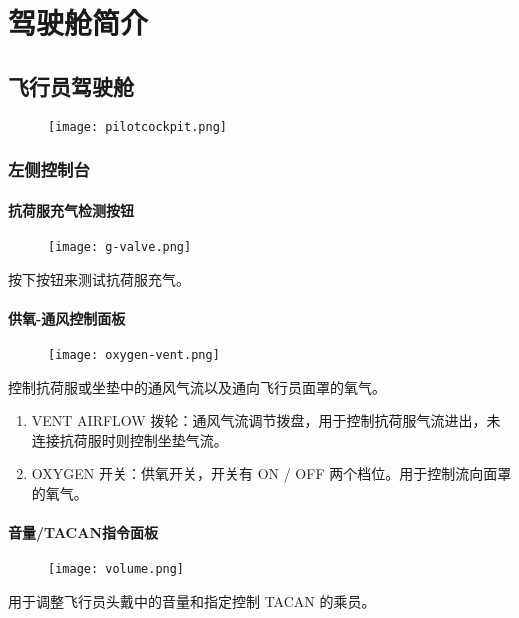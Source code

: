 
\chapter{驾驶舱简介}

\section{飞行员驾驶舱}

\begin{figure}[htb]
  \center
  \texttt{[image: pilotcockpit.png]}
\end{figure}

\subsection{左侧控制台}

\subsubsection{抗荷服充气检测按钮}
\begin{figure}[htb]
  \center
  \texttt{[image: g-valve.png]}
\end{figure}
按下按钮来测试抗荷服充气。

\subsubsection{供氧-通风控制面板}

\begin{figure}[htb]
  \center
  \texttt{[image: oxygen-vent.png]}
\end{figure}
控制抗荷服或坐垫中的通风气流以及通向飞行员面罩的氧气。

\begin{enumerate}
  \item VENT AIRFLOW 拨轮：通风气流调节拨盘，用于控制抗荷服气流进出，未连接抗荷服时则控制坐垫气流。
  \item OXYGEN 开关：供氧开关，开关有 ON / OFF 两个档位。用于控制流向面罩的氧气。
\end{enumerate}

\subsubsection{音量/TACAN指令面板}

\begin{figure}[htb]
  \center
  \texttt{[image: volume.png]}
\end{figure}
用于调整飞行员头戴中的音量和指定控制 TACAN 的乘员。


